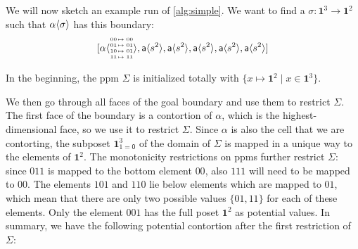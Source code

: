 \documentclass{llncs}
\newcommand{\continuation}{??}
\newenvironment{examplecontd}[1]
{\renewcommand{\continuation}{\ref{#1}}\expcont[continued]}
{\endexpcont}
\newcommand{\mlist}[1]{[ {#1} ]}
\newcommand{\pint}[1]{\mathbf{1}^{#1}}
\newcommand{\pintrestr}[3]{\mathbf{1}^{#1}_{{#2}={#3}}}
\newcommand{\izero}{\mathsf{0}}
\newcommand{\smap}[1]{s^{{#1}}}
\newcommand{\cont}[2]{\ensuremath{ \ifthenelse{\equal{#2}{}}{#1}{{#1}\langle{#2}\rangle}} }
\newcommand{\cset}[1]{\ensuremath{\mathsf{{#1}}}}
\newcommand{\substfour}[4]{\tiny
  \arraycolsep=.4pt\def\arraystretch{1}
  \begin{array}{ll}
    00 &\mapsto {#1} \\
    01 &\mapsto {#2} \\
    10 &\mapsto {#3} \\
    11 &\mapsto {#4} 
  \end{array}
}
\begin{document}
\begin{examplecontd}{exp:sndsphere}

  We will now sketch an example run of \autoref{alg:simple}. We want to find a
  $\sigma : \pint{3} \to \pint{2}$ such that $\cont{\alpha}{\sigma}$ has this boundary:
$$\mlist{ \cont{\cset{\alpha}}{\substfour{00}{01}{01}{11}} ,
  \cont{\cset{a}}{\smap{2}} , \cont{\cset{a}}{\smap{2}} ,
  \cont{\cset{a}}{\smap{2}} , \cont{\cset{a}}{\smap{2}} ,
  \cont{\cset{a}}{\smap{2}}}$$

In the beginning, the ppm $\Sigma$ is initialized totally with $\{ x \mapsto
\pint{2} \mid x \in \pint{3}\}$.

We then go through all faces of the goal boundary and use them to restrict
$\Sigma$.
The first face of the boundary is a contortion of $\alpha$, which is the
highest-dimensional face, so we use it to restrict $\Sigma$. Since $\alpha$ is also
the cell that we are contorting, the subposet $\pintrestr{3}{1}{\izero}$
of the domain of $\Sigma$
is mapped in a unique way to the elements of $\pint{2}$. The monotonicity
restrictions on ppms further restrict $\Sigma$: since $011$ is mapped to the
bottom element $00$, also $111$ will need to be mapped to $00$. The elements
$101$ and $110$ lie below elements which are mapped to $01$, which mean that
there are only two possible values $\{01, 11\}$ for each of these elements. Only
the element $001$ has the full poset $\pint{2}$ as potential values. In summary,
we have the following potential contortion after the first restriction of $\Sigma$:

\begin{center}
\end{center}
\end{examplecontd}
\end{document}
